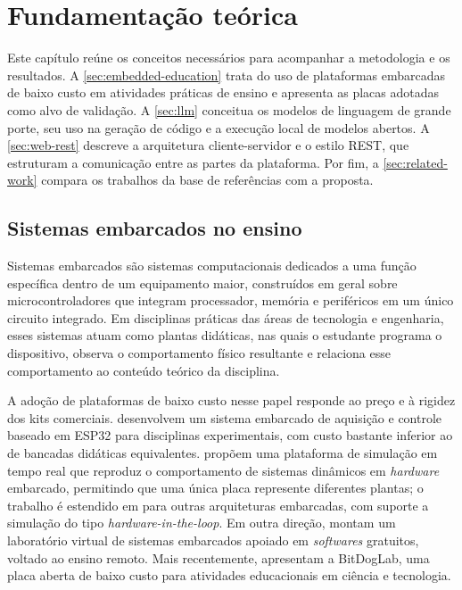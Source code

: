 
\chapter{Fundamentação teórica}
\label{chap:theory}

Este capítulo reúne os conceitos necessários para acompanhar a metodologia e os resultados. A \autoref{sec:embedded-education} trata do uso de plataformas embarcadas de baixo custo em atividades práticas de ensino e apresenta as placas adotadas como alvo de validação. A \autoref{sec:llm} conceitua os modelos de linguagem de grande porte, seu uso na geração de código e a execução local de modelos abertos. A \autoref{sec:web-rest} descreve a arquitetura cliente-servidor e o estilo REST, que estruturam a comunicação entre as partes da plataforma. Por fim, a \autoref{sec:related-work} compara os trabalhos da base de referências com a proposta.

\section{Sistemas embarcados no ensino}
\label{sec:embedded-education}

Sistemas embarcados são sistemas computacionais dedicados a uma função específica dentro de um equipamento maior, construídos em geral sobre microcontroladores que integram processador, memória e periféricos em um único circuito integrado. Em disciplinas práticas das áreas de tecnologia e engenharia, esses sistemas atuam como plantas didáticas, nas quais o estudante programa o dispositivo, observa o comportamento físico resultante e relaciona esse comportamento ao conteúdo teórico da disciplina.

A adoção de plataformas de baixo custo nesse papel responde ao preço e à rigidez dos kits comerciais.  desenvolvem um sistema embarcado de aquisição e controle baseado em ESP32 para disciplinas experimentais, com custo bastante inferior ao de bancadas didáticas equivalentes.  propõem uma plataforma de simulação em tempo real que reproduz o comportamento de sistemas dinâmicos em \textit{hardware} embarcado, permitindo que uma única placa represente diferentes plantas; o trabalho é estendido em  para outras arquiteturas embarcadas, com suporte a simulação do tipo \textit{hardware-in-the-loop}. Em outra direção,  montam um laboratório virtual de sistemas embarcados apoiado em \textit{softwares} gratuitos, voltado ao ensino remoto. Mais recentemente,  apresentam a BitDogLab, uma placa aberta de baixo custo para atividades educacionais em ciência e tecnologia.

